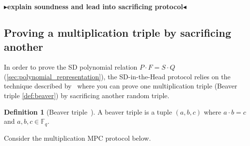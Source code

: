 \documentclass[twoside,11pt]{report}
\theoremstyle{definition}
\newtheorem{definition}{Definition}[section]
\theoremstyle{plain}
\newcommand{\todo}[1]{{\color[rgb]{.5,0,0}\textbf{$\blacktriangleright$#1$\blacktriangleleft$}}}
\begin{document}
\todo{explain soundness and lead into sacrificing protocol}

\subsection{Proving a multiplication triple by sacrificing another}\label{sec:sacrifice_beaver}

In order to prove the SD polynomial relation $P \cdot F = S \cdot Q$ (\autoref{sec:polynomial_representation}), the SD-in-the-Head protocol relies on the technique described by~\cite{baum2020concretely} where you can prove one multiplication triple (Beaver triple \autoref{def:beaver}) by sacrificing another random triple.

\begin{definition}[Beaver triple~\cite{beaver1992efficient}]\label{def:beaver}
  A beaver triple is a tuple $(a, b, c)$ where $a \cdot b = c$ and $a, b, c \in \mathbb{F}_q$.
\end{definition}

Consider the multiplication MPC protocol below.
\end{document}
